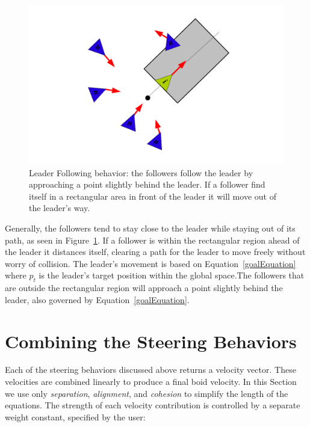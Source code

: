 \begin{figure}[htbp]
\begin{center}
\includegraphics[scale=0.75]{figures/leaderFollowing.pdf}
\caption{Leader Following behavior: the followers follow the leader by approaching a point slightly behind the leader. If a follower find itself in a rectangular area in front of the leader it will move out of the leader's way.}
\label{leaderPDF}
\end{center}
\end{figure}

Generally, the followers tend to stay close to the leader while staying out of its path, as seen in Figure~\ref{leaderPDF}. If a follower is within the rectangular region ahead of the leader it distances itself, clearing a path for the leader to move freely without worry of collision. The leader's movement is  based on Equation~\ref{goalEquation} where $p_t$ is the leader's target position within the global space.The followers that are outside the rectangular region will approach a point slightly behind the leader, also governed by Equation~\ref{goalEquation}.

\section{Combining the Steering Behaviors}
Each of the steering behaviors discussed above returns a velocity vector. These velocities are combined linearly to produce a final boid velocity. In this Section we use only \textit{separation}, \textit{alignment}, and \textit{cohesion} to simplify the length of the equations. The strength of each velocity contribution is controlled by a separate weight constant, specified by the user: 

